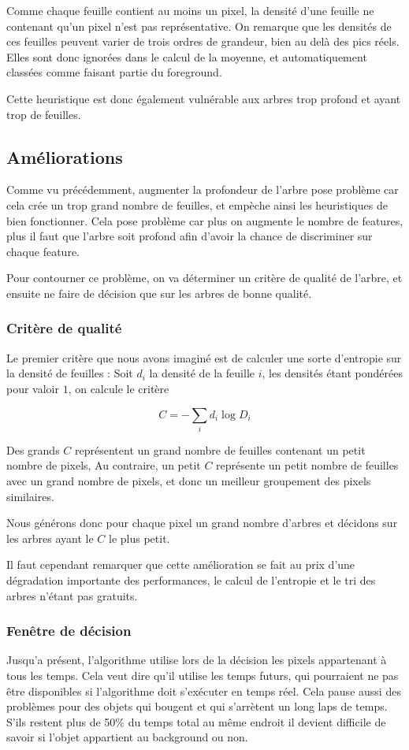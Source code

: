 \documentclass[11pt,a4paper]{report}
\begin{document}
			Comme chaque feuille contient au moins un pixel, la densité d'une feuille ne contenant qu'un pixel n'est pas
			représentative. On remarque que les densités de ces feuilles peuvent varier de trois ordres de grandeur, bien
			au delà des pics réels. Elles sont donc ignorées dans le calcul de la moyenne, et automatiquement classées
			comme faisant partie du foreground. 

			Cette heuristique est donc également vulnérable aux arbres trop profond et ayant trop de feuilles. 

	\subsection{Améliorations}
		Comme vu précédemment, augmenter la profondeur de l'arbre pose problème car cela crée un trop grand nombre de feuilles, 
		et empèche ainsi les heuristiques de bien fonctionner. Cela pose problème car plus on augmente le nombre de features,
		plus il faut que l'arbre soit profond afin d'avoir la chance de discriminer sur chaque feature. 

		Pour contourner ce problème, on va déterminer un critère de qualité de l'arbre, et ensuite ne faire de décision que sur
		les arbres de bonne qualité. 
		\subsubsection{Critère de qualité}
			Le premier critère que nous avons imaginé est de calculer une sorte d'entropie sur la densité de feuilles : 
			Soit $d_{i}$ la densité de la feuille $i$, les densités étant pondérées pour valoir $1$, on calcule le critère 
			
			\[ C = -\sum_{i} d_{i}\log{D_{i}} \]

			Des grands $C$ représentent un grand nombre de feuilles contenant un petit nombre de pixels, Au contraire, un petit $C$
			représente un petit nombre de feuilles avec un grand nombre de pixels, et donc un meilleur groupement des pixels
			similaires. 

			Nous générons donc pour chaque pixel un grand nombre d'arbres et décidons sur les arbres ayant le $C$ le plus petit.

			Il faut cependant remarquer que cette amélioration se fait au prix d'une dégradation importante des performances,
			le calcul de l'entropie et le tri des arbres n'étant pas gratuits.
		\subsubsection{Fenêtre de décision}
			Jusqu'a présent, l'algorithme utilise lors de la décision les pixels appartenant à tous les temps. Cela veut dire qu'il
			utilise les temps futurs, qui pourraient ne pas être disponibles si l'algorithme doit s'exécuter en temps réel. Cela
			pause aussi des problèmes pour des objets qui bougent et qui s'arrètent un long laps de temps. S'ils restent plus
			de 50\% du temps total au même endroit il devient difficile de savoir si l'objet appartient au background ou non.
\end{document}
